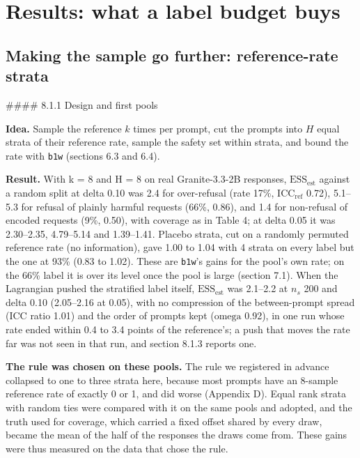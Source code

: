 \documentclass[11pt]{article}
\begin{document}
\section{Results: what a label budget buys}

\subsection{Making the sample go further: reference-rate strata}

\#\#\#\# 8.1.1 Design and first pools


\textbf{Idea.} Sample the reference $k$ times per prompt, cut the prompts into $H$ equal strata of their reference rate, sample the safety set within strata, and bound the rate with \texttt{b1w} (sections 6.3 and 6.4).


\textbf{Result.} With k = 8 and H = 8 on real Granite-3.3-2B responses, $\mathrm{ESS}_{\mathrm{est}}$ against a random split at delta 0.10 was 2.4 for over-refusal (rate 17\%, $\mathrm{ICC}_{\mathrm{ref}}$ 0.72), 5.1--5.3 for refusal of plainly harmful requests (66\%, 0.86), and 1.4 for non-refusal of encoded requests (9\%, 0.50), with coverage as in Table 4; at delta 0.05 it was 2.30--2.35, 4.79--5.14 and 1.39--1.41. Placebo strata, cut on a randomly permuted reference rate (no information), gave 1.00 to 1.04 with 4 strata on every label but the one at 93\% (0.83 to 1.02). These are \texttt{b1w}'s gains for the pool's own rate; on the 66\% label it is over its level once the pool is large (section 7.1). When the Lagrangian pushed the stratified label itself, $\mathrm{ESS}_{\mathrm{est}}$ was 2.1--2.2 at $n_{s}$ 200 and delta 0.10 (2.05--2.16 at 0.05), with no compression of the between-prompt spread (ICC ratio 1.01) and the order of prompts kept ($\text{omega}$ 0.92), in one run whose rate ended within 0.4 to 3.4 points of the reference's; a push that moves the rate far was not seen in that run, and section 8.1.3 reports one.


\textbf{The rule was chosen on these pools.} The rule we registered in advance collapsed to one to three strata here, because most prompts have an 8-sample reference rate of exactly 0 or 1, and did worse (Appendix D). Equal rank strata with random ties were compared with it on the same pools and adopted, and the truth used for coverage, which carried a fixed offset shared by every draw, became the mean of the half of the responses the draws come from. These gains were thus measured on the data that chose the rule.
\end{document}
